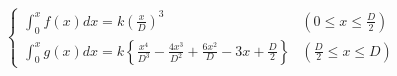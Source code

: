 \documentclass[
  11pt,
  border=2,
  convert={
    density=150 -alpha off,
    outext=.png
  },
]{standalone}
\begin{document}
$
  \begin{cases}
    \displaystyle \int_0^x f(x) dx = k\left(\frac{x}{D}\right)^3 & (0 \leq x \leq \frac{D}{2})
    \\
    \displaystyle \int_0^x g(x) dx = k\left\{ \frac{x^4}{D^3} - \frac{4x^3}{D^2} + \frac{6x^2}{D} - 3x + \frac{D}{2} \right\}  & (\frac{D}{2} \leq x \leq D)
  \end{cases}
$
\end{document}
